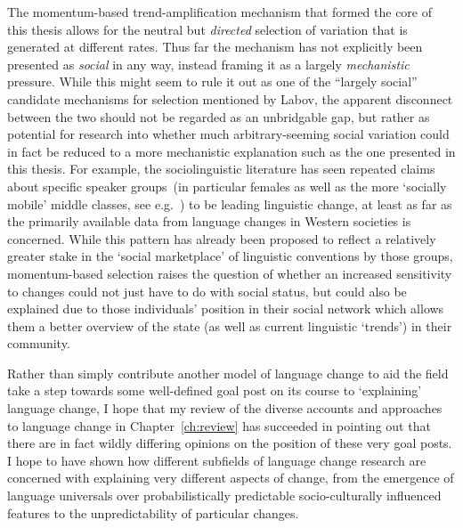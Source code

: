 The momentum-based trend-amplification mechanism that formed the core of this thesis allows for the neutral but \emph{directed} selection of variation that is generated at different rates. Thus far the mechanism has not explicitly been presented as \emph{social} in any way, instead framing it as a largely \emph{mechanistic} pressure.
While this might seem to rule it out as one of the ``largely social'' candidate mechanisms for selection mentioned by Labov, the apparent disconnect between the two should not be regarded as an unbridgable gap, but rather as potential for research into whether much arbitrary-seeming social variation could in fact be reduced to a more mechanistic explanation such as the one presented in this thesis.
For example, the sociolinguistic literature has seen repeated claims about specific speaker groups~(in particular females as well as the more `socially mobile' middle classes, see e.g.~\citealt[p.501]{Labov2001}) to be leading linguistic change, at least as far as the primarily available data from language changes in Western societies is concerned. While this pattern has already been proposed to reflect a relatively greater stake in the `social marketplace' of linguistic conventions by those groups, momentum-based selection raises the question of whether an increased sensitivity to changes could not just have to do with social status, but could also be explained due to those individuals' position in their social network which allows them a better overview of the state (as well as current linguistic `trends') in their community.


Rather than simply contribute another model of language change to aid the field take a step towards some well-defined goal post on its course to `explaining' language change, I hope that my review of the diverse accounts and approaches to language change in Chapter~\ref{ch:review} has succeeded in pointing out that there are in fact wildly differing opinions on the position of these very goal posts. I hope to have shown how different subfields of language change research are concerned with explaining very different aspects of change, from the emergence of language universals over probabilistically predictable socio-culturally influenced features to the unpredictability of particular changes.

